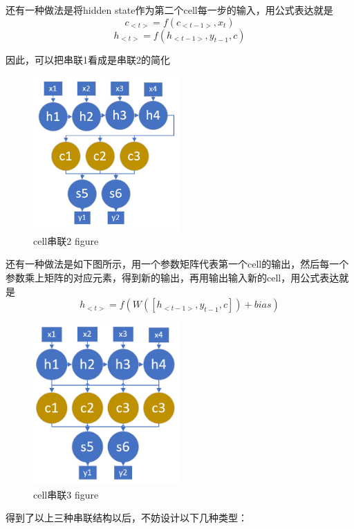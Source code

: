 \documentclass[11pt]{ctexart}
\begin{document}
还有一种做法是将hidden state作为第二个cell每一步的输入，用公式表达就是
$$c_{<t>} = f(c_{<t-1>},x_t)$$
$$h_{<t>} = f(h_{<t-1>},y_{t-1},c)$$

因此，可以把串联1看成是串联2的简化
\begin{figure}[H]
\begin{center}
\includegraphics[width=0.5\textwidth]{series1.PNG}
\end{center}
\caption{cell串联2 figure}
\label{FIG.17}
\end{figure}

还有一种做法是如下图所示，用一个参数矩阵代表第一个cell的输出，然后每一个参数乘上矩阵的对应元素，得到新的输出，再用输出输入新的cell，用公式表达就是
$$h_{<t>} = f(W([h_{<t-1>},y_{t-1},c])+bias)$$

\begin{figure}[H]
\begin{center}
\includegraphics[width=0.5\textwidth]{series3.PNG}
\end{center}
\caption{cell串联3 figure}
\label{FIG.18}
\end{figure}

得到了以上三种串联结构以后，不妨设计以下几种类型：
\end{document}
